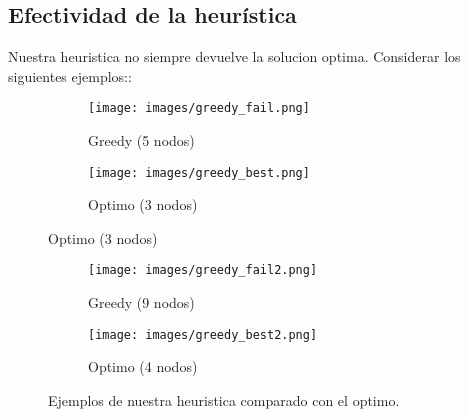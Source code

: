 \subsection{Efectividad de la heurística}

Nuestra heuristica no siempre devuelve la solucion optima. Considerar los siguientes ejemplos::

\begin{figure}[ht]
\centering
\begin{subfigure}[b]{0.4\textwidth}
	\texttt{[image: images/greedy\_fail.png]}
	\caption{Greedy (5 nodos)}
\end{subfigure}
\begin{subfigure}[b]{0.4\textwidth}
	\texttt{[image: images/greedy\_best.png]}
	\caption{Optimo (3 nodos)}
\end{subfigure}
\end{figure}

\begin{figure}[ht]
\centering
\begin{subfigure}[b]{0.4\textwidth}
	\texttt{[image: images/greedy\_fail2.png]}
	\caption{Greedy (9 nodos)}
\end{subfigure}
\begin{subfigure}[b]{0.4\textwidth}
	\texttt{[image: images/greedy\_best2.png]}
	\caption{Optimo (4 nodos)}
\end{subfigure}
\caption{Ejemplos de nuestra heuristica comparado con el optimo.}
\end{figure}